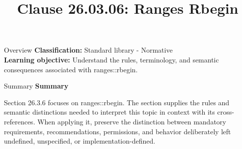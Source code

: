 \documentclass[10pt,letterpaper]{article}
\title{Clause 26.03.06: Ranges Rbegin}
\author{}
\date{}
\begin{document}
\maketitle
\begin{CornellOverviewBox}{Overview}
\textbf{Classification:} Standard library - Normative\\[2pt]
\textbf{Learning objective:} Understand the rules, terminology, and semantic consequences associated with ranges::rbegin.
\end{CornellOverviewBox}\begin{CornellSummaryBox}{Summary}
{\sffamily\bfseries\color{Accent} Summary}\par\vspace{3pt}Section 26.3.6 focuses on ranges::rbegin. The section supplies the rules and semantic distinctions needed to interpret this topic in context with its cross-references. When applying it, preserve the distinction between mandatory requirements, recommendations, permissions, and behavior deliberately left undefined, unspecified, or implementation-defined.
\end{CornellSummaryBox}
\end{document}
